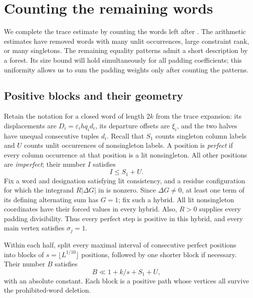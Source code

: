 \section{Counting the remaining words}\label{q:forest-section}

We complete the trace estimate by counting the words left after
.  The arithmetic estimates have
removed words with many unlit occurrences, large constraint rank, or many
singletons.  The remaining equality patterns admit a short description
by a forest.  Its size bound will hold simultaneously for all padding
coefficients; this uniformity allows us to sum the padding weights only
after counting the patterns.

\subsection{Positive blocks and their geometry}

Retain the notation for a closed word of length $2k$ from the trace
expansion: its displacements are $D_i=\varepsilon_i hq_i d_i$, its
departure offsets are $\xi_i$, and the two halves have unequal
consecutive tuples $d_i$.  Recall that $S_1$ counts singleton column
labels and $U$ counts unlit occurrences of nonsingleton labels.  A
position is \emph{perfect} if every column occurrence at that position
is a lit nonsingleton.  All other positions are \emph{imperfect}; their
number $I$ satisfies
\begin{equation}\label{q:imperfect-count}
 I\le S_1+U.
\end{equation}
Fix a word and designation satisfying lit consistency, and a residue
configuration for which the integrand $R|\Delta G|$ in
 is nonzero.  Since $\Delta G\ne0$, at least
one term of its defining alternating sum has $G=1$; fix such a hybrid.
All lit nonsingleton coordinates have their forced
values in every hybrid.  Also, $R>0$ supplies every padding
divisibility.  Thus every perfect step is positive in this hybrid,
and every main vertex satisfies $\sigma_j=1$.

Within each half, split every maximal interval of consecutive perfect
positions into blocks of $s=\lfloor L^{1/10}\rfloor$ positions, followed
by one shorter block if necessary.  Their number $B$ satisfies
\begin{equation}\label{q:block-count}
 B\ll 1+k/s+S_1+U,
\end{equation}
with an absolute constant.  Each block is a positive path whose
vertices all survive the prohibited-word deletion.

